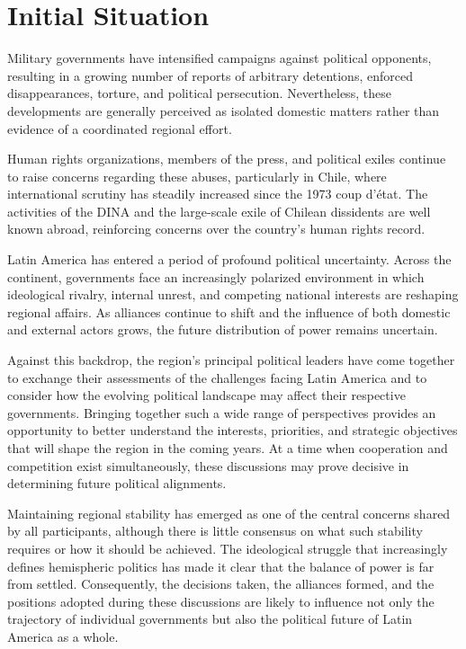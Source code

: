 \section{Initial Situation}


Military governments have intensified campaigns against political opponents, resulting in a growing number of reports of arbitrary detentions, enforced disappearances, torture, and political persecution. Nevertheless, these developments are generally perceived as isolated domestic matters rather than evidence of a coordinated regional effort.

Human rights organizations, members of the press, and political exiles continue to raise concerns regarding these abuses, particularly in Chile, where international scrutiny has steadily increased since the 1973 coup d’état. The activities of the DINA and the large-scale exile of Chilean dissidents are well known abroad, reinforcing concerns over the country’s human rights record.

Latin America has entered a period of profound political uncertainty. Across the continent, governments face an increasingly polarized environment in which ideological rivalry, internal unrest, and competing national interests are reshaping regional affairs. As alliances continue to shift and the influence of both domestic and external actors grows, the future distribution of power remains uncertain.

Against this backdrop, the region's principal political leaders have come together to exchange their assessments of the challenges facing Latin America and to consider how the evolving political landscape may affect their respective governments. Bringing together such a wide range of perspectives provides an opportunity to better understand the interests, priorities, and strategic objectives that will shape the region in the coming years. At a time when cooperation and competition exist simultaneously, these discussions may prove decisive in determining future political alignments.

Maintaining regional stability has emerged as one of the central concerns shared by all participants, although there is little consensus on what such stability requires or how it should be achieved. The ideological struggle that increasingly defines hemispheric politics has made it clear that the balance of power is far from settled. Consequently, the decisions taken, the alliances formed, and the positions adopted during these discussions are likely to influence not only the trajectory of individual governments but also the political future of Latin America as a whole.
